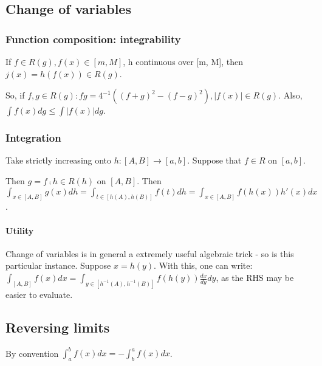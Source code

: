 \documentclass[oneside, article]{memoir}
\begin{document}
\subsection{Change of variables}
\subsubsection{Function composition: integrability}
If $f \in R(g), f(x) \in [m, M]$, h continuous over [m, M], then $j(x) = h(f(x)) \in R(g)$. 


So, if $f, g \in R(g): fg = 4^{-1}((f+g)^{2} - (f-g)^{2}), |f(x)| \in R(g)$. Also, $\int f(x) dg \leq \int |f(x)| dg$.

\subsubsection{Integration}
Take strictly increasing onto $h:[A, B] \to [a, b]$. Suppose that $f \in R$ on $[a, b]$.

Then $g = f \comp h \in R(h)$ on $[A, B]$. Then $\int_{x \in [A, B]} g(x) dh = \int_{t \in [h(A), h(B)]} f(t) dh = \int_{x \in [A, B]} f(h(x)) h'(x)dx $.


\paragraph{Utility}
Change of variables is in general a extremely useful algebraic trick - so is this particular instance. Suppose $x = h(y)$. With this, one can write: $\int_{[A, B]} f(x) dx = \int_{y \in [h^{-1}(A), h^{-1}(B)]} f(h(y)) \frac{dx}{dy}dy $, as the RHS may be easier to evaluate.

\subsection{Reversing limits}
By convention $\int_a^bf(x)dx = - \int_b^af(x)dx$.
\end{document}
